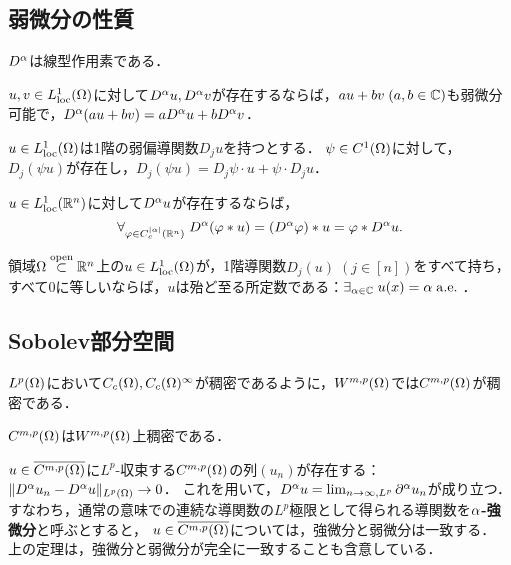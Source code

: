 \documentclass[uplatex,dvipdfmx]{jsreport}
\begin{document}
\subsection{弱微分の性質}

\begin{tcolorbox}[colframe=ForestGreen, colback=ForestGreen!10!white,breakable,colbacktitle=ForestGreen!40!white,coltitle=black,fonttitle=\bfseries\sffamily,
title=]
    $D^\alpha$は線型作用素である．
\end{tcolorbox}

\begin{proposition}[線型作用素]
    $u,v\in L^1_{\mathrm{loc}}(\Omega)$に対して$D^\alpha u,D^\alpha v$が存在するならば，$au+bv\;(a,b\in\mathbb{C})$も弱微分可能で，$D^\alpha(au+bv)=aD^\alpha u+bD^\alpha v$．
\end{proposition}

\begin{theorem}[Leibniz則]
    $u\in L^1_{\mathrm{loc}}(\Omega)$は1階の弱偏導関数$D_ju$を持つとする．
    $\psi\in C^1(\Omega)$に対して，$D_j(\psi u)$が存在し，$D_j(\psi u)=D_j\psi\cdot u+\psi\cdot D_ju$．
\end{theorem}

\begin{proposition}[畳み込みとの可換性]
    $u\in L^1_{\mathrm{loc}}(\mathbb{R}^n)$に対して$D^\alpha u$が存在するならば，
    \[\forall_{\varphi\in C_c^{\lvert\alpha\rvert}(\mathbb{R}^n)}\;D^\alpha(\varphi *u)=(D^\alpha\varphi)*u=\varphi *D^\alpha u.\]
\end{proposition}

\begin{proposition}
    領域$\Omega\overset{\mathrm{open}}{\subset}\mathbb{R}^n$上の$u\in L^1_{\mathrm{loc}}(\Omega)$が，1階導関数$D_j(u)\;(j\in[n])$をすべて持ち，すべて$0$に等しいならば，$u$は殆ど至る所定数である：$\exists_{\alpha\in\mathbb{C}}\;u(x)=\alpha\;\mathrm{a.e.}\;$．
\end{proposition}

\subsection{Sobolev部分空間}

\begin{tcolorbox}[colframe=ForestGreen, colback=ForestGreen!10!white,breakable,colbacktitle=ForestGreen!40!white,coltitle=black,fonttitle=\bfseries\sffamily,
title=]
    $L^p(\Omega)$において$C_c(\Omega),C_c(\Omega)^\infty$が稠密であるように，$W^{m,p}(\Omega)$では$C^{m,p}(\Omega)$が稠密である．
\end{tcolorbox}

\begin{theorem}
    $C^{m,p}(\Omega)$は$W^{m,p}(\Omega)$上稠密である．
\end{theorem}
\begin{remark}
    $u\in\overline{C^{m,p}(\Omega)}$に$L^p$-収束する$C^{m,p}(\Omega)$の列$(u_n)$が存在する：$\|D^\alpha u_n-D^\alpha u\|_{L^p(\Omega)}\to0$．
    これを用いて，$D^\alpha u=\lim_{n\to\infty,L^p}\partial^\alpha u_n$が成り立つ．
    すなわち，通常の意味での連続な導関数の$L^p$極限として得られる導関数を\textbf{$\alpha$-強微分}と呼ぶとすると，
    $u\in\overline{C^{m,p}(\Omega)}$については，強微分と弱微分は一致する．
    上の定理は，強微分と弱微分が完全に一致することも含意している．
\end{remark}
\end{document}

